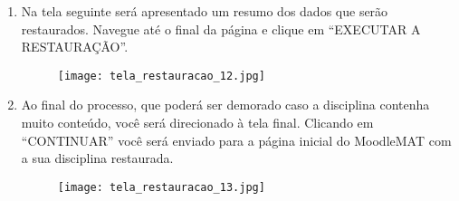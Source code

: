 \documentclass[12pt]{report}
\begin{document}
\begin{enumerate}[\bf 1)]
	\newpage

	\item Na tela seguinte ser\'a apresentado um resumo dos dados que ser\~ao restaurados. Navegue at\'e o final da p\'agina e clique em ``EXECUTAR A RESTAURA\c{C}\~AO''.
	\begin{figure}[H]
    	\centering
    	\hspace*{-2.5cm}\texttt{[image: tela\_restauracao\_12.jpg]}
  	\end{figure}

	\newpage

	\item Ao final do processo, que poder\'a ser demorado caso a disciplina contenha muito conte\'udo, voc\^e ser\'a direcionado \`a tela final. Clicando em ``CONTINUAR'' voc\^e ser\'a enviado para a p\'agina inicial do MoodleMAT com a sua disciplina restaurada.
	\begin{figure}[H]
    	\centering
    	\hspace*{-2.5cm}\texttt{[image: tela\_restauracao\_13.jpg]}
  	\end{figure}
\end{enumerate}
\end{document}

